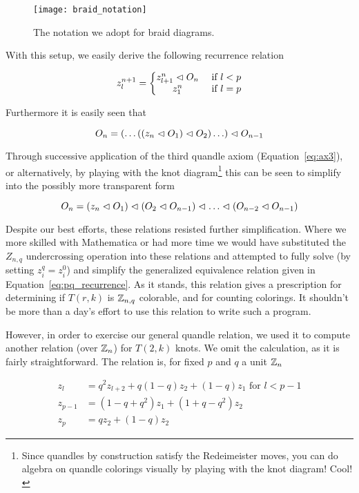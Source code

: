\documentclass[paper.tex]{subfiles}
\begin{document}
\begin{figure}[h]
   \centering
   \texttt{[image: braid\_notation]}
   \caption{The notation we adopt for braid diagrams.}\label{fig:braid_notation}
\end{figure}

With this setup, we easily derive the following recurrence relation

\begin{equation}
   \label{eq:pq_recurrence}
   z^{n+1}_l = \left\{
   \begin{matrix}
        z^n_{l+1} \vartriangleleft O_n &\text{ if } l < p \\
        z^n_1 &\text{ if } l = p
   \end{matrix}
   \right.
\end{equation}

Furthermore it is easily seen that

\begin{equation}
   O_n = (\ldots((z_n \vartriangleleft O_1) \vartriangleleft O_2) \ldots ) \vartriangleleft O_{n-1}
\end{equation}

Through successive application of the third quandle axiom (Equation~\ref{eq:ax3}), or alternatively, by playing with the knot diagram\footnote{Since quandles by construction satisfy the Redeimeister moves, you can do algebra
        on quandle colorings visually by playing with the knot diagram! Cool!} this can be seen to simplify into the possibly more transparent form

\begin{equation}
   O_n = (z_n \vartriangleleft O_1) \vartriangleleft (O_2 \vartriangleleft O_{n -1}) \vartriangleleft \ldots \vartriangleleft (O_{n - 2} \vartriangleleft O_{n - 1})
\end{equation}

Despite our best efforts, these relations resisted further simplification. Where we more skilled with Mathematica or had more time we would have substituted the $Z_{n,q}$ undercrossing operation into these relations
     and attempted to fully solve (by setting $z^q_{i} = z^0_{i}$) and simplify the generalized equivalence relation given in Equation~\ref{eq:pq_recurrence}. As it stands, this relation gives a prescription for
     determining if $T(r,k)$ is $\mathbb{Z}_{n,q}$ colorable, and for counting colorings. It shouldn't be more than a day's effort to use this relation to write such a program.

However, in order to exercise our general quandle relation, we used it to compute another relation (over $\mathbb{Z}_n$) for $T(2, k)$ knots. We omit the calculation, as it is fairly straightforward. The relation is, for fixed $p$
      and $q$ a unit $\mathbb{Z}_n$

\begin{align}
    z_l &= q^2 z_{l + 2} + q(1 - q) z_2 + (1 - q) z_1 \text{ for } l < p -1\\
    z_{p - 1} &= (1 - q + q^2) z_1 + (1 + q - q^2) z_2 \\
    z_p  &= q z_2 + (1 - q) z_2
\end{align}
\end{document}
